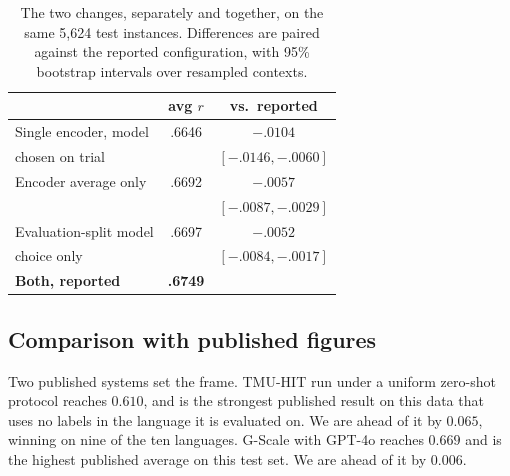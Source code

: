 \begin{table}[t]
\centering
\small
\begin{tabular}{lcc}
\toprule
 & avg $r$ & vs.\ reported \\
\midrule
Single encoder, model                 & .6646 & $-.0104$ \\
\quad chosen on trial                 &       & $[-.0146, -.0060]$ \\
\addlinespace[2pt]
Encoder average only                  & .6692 & $-.0057$ \\
                                      &       & $[-.0087, -.0029]$ \\
\addlinespace[2pt]
Evaluation-split model                & .6697 & $-.0052$ \\
\quad choice only                     &       & $[-.0084, -.0017]$ \\
\addlinespace[2pt]
\textbf{Both, reported}               & \textbf{.6749} & \\
\bottomrule
\end{tabular}
\caption{The two changes, separately and together, on the same 5{,}624
test instances. Differences are paired against the reported
configuration, with 95\% bootstrap intervals over resampled contexts.}
\label{tab:ablation}
\end{table}

\subsection{Comparison with published figures}
\label{sec:published}

Two published systems set the frame. TMU-HIT run under a uniform
zero-shot protocol reaches $0.610$, and is the strongest published
result on this data that uses no labels in the language it is
evaluated on. We are ahead of it by $0.065$, winning on nine of the ten
languages. G-Scale with GPT-4o reaches $0.669$ and is the highest
published average on this test set. We are ahead of it by $0.006$.

